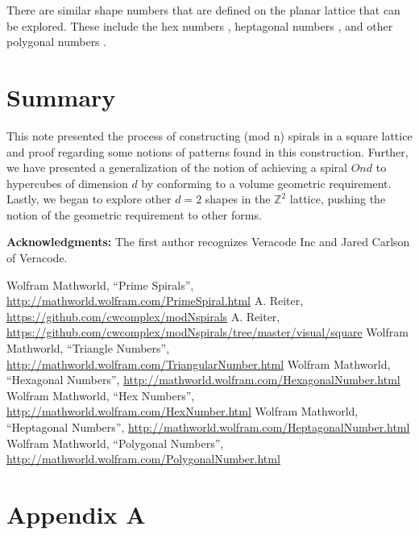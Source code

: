 \documentclass[11pt,reqno]{amsart}
\theoremstyle{mydef}
\begin{document}
There are similar shape numbers that are defined on the planar lattice that can be explored. These include the 
hex numbers \cite{HexNum}, heptagonal numbers \cite{Hepta}, and other polygonal numbers \cite{Polyg}.

\section{Summary}
This note presented the process of constructing (mod n) spirals in a square lattice and proof regarding some 
notions of patterns found in this construction. Further, we have presented a generalization of the notion of
achieving a spiral $Ond$ to hypercubes of dimension $d$ by conforming to a volume geometric requirement.
Lastly, we began to explore other $d = 2$ shapes in the $\mathbb{Z}^2$ lattice, pushing the notion of the 
geometric requirement to other forms. 

\vspace{12pt}\noindent\textbf{Acknowledgments:}\quad
The first author recognizes Veracode Inc and Jared Carlson of Veracode.

\begin{thebibliography}{1}
 Wolfram Mathworld, ``Prime Spirals'',
  \url{http://mathworld.wolfram.com/PrimeSpiral.html}
 A. Reiter,
  \url{https://github.com/cwcomplex/modNspirals}
 A. Reiter,
  \url{https://github.com/cwcomplex/modNspirals/tree/master/visual/square}
 Wolfram Mathworld, ``Triangle Numbers'',
  \url{http://mathworld.wolfram.com/TriangularNumber.html}
 Wolfram Mathworld, ``Hexagonal Numbers'',
  \url{http://mathworld.wolfram.com/HexagonalNumber.html}
 Wolfram Mathworld, ``Hex Numbers'',
  \url{http://mathworld.wolfram.com/HexNumber.html}
 Wolfram Mathworld, ``Heptagonal Numbers'',
  \url{http://mathworld.wolfram.com/HeptagonalNumber.html}
 Wolfram Mathworld, ``Polygonal Numbers'',
  \url{http://mathworld.wolfram.com/PolygonalNumber.html}
\end{thebibliography}



\clearpage
\section{Appendix A}
\end{document}
